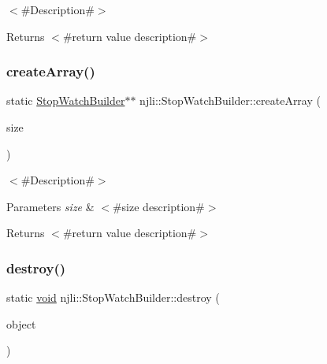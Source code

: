 $<$\#\+Description\#$>$

\begin{DoxyReturn}{Returns}
$<$\#return value description\#$>$ 
\end{DoxyReturn}
\mbox{\label{classnjli_1_1_stop_watch_builder_a3e543a079e8abb2c0b92b6b088e74049}} 
\subsubsection{\texorpdfstring{create\+Array()}{createArray()}}
{\footnotesize\ttfamily static \mbox{\hyperlink{classnjli_1_1_stop_watch_builder}{Stop\+Watch\+Builder}}$\ast$$\ast$ njli\+::\+Stop\+Watch\+Builder\+::create\+Array (\begin{DoxyParamCaption}\item[{const \mbox{\hyperlink{_util_8h_a10e94b422ef0c20dcdec20d31a1f5049}{u32}}}]{size }\end{DoxyParamCaption})\hspace{0.3cm}{\ttfamily [static]}}

$<$\#\+Description\#$>$


\begin{DoxyParams}{Parameters}
{\em size} & $<$\#size description\#$>$\\
\hline
\end{DoxyParams}
\begin{DoxyReturn}{Returns}
$<$\#return value description\#$>$ 
\end{DoxyReturn}
\mbox{\label{classnjli_1_1_stop_watch_builder_a78ee75c8ee0f8318eb12e20263549e76}} 
\subsubsection{\texorpdfstring{destroy()}{destroy()}}
{\footnotesize\ttfamily static \mbox{\hyperlink{_thread_8h_af1e856da2e658414cb2456cb6f7ebc66}{void}} njli\+::\+Stop\+Watch\+Builder\+::destroy (\begin{DoxyParamCaption}\item[{\mbox{\hyperlink{classnjli_1_1_stop_watch_builder}{Stop\+Watch\+Builder}} $\ast$}]{object }\end{DoxyParamCaption})\hspace{0.3cm}{\ttfamily [static]}}


